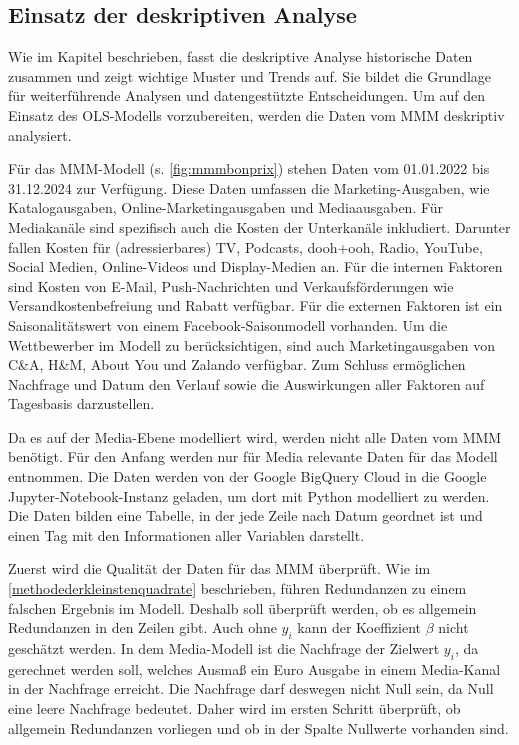 \subsection{Einsatz der deskriptiven Analyse}
\label{EinsatzDerDeskriptivenAnalyse}
Wie im Kapitel  beschrieben, fasst die deskriptive Analyse historische Daten zusammen und zeigt wichtige Muster und Trends auf. Sie bildet die Grundlage für weiterführende Analysen und datengestützte Entscheidungen. Um auf den Einsatz des \ac{OLS}-Modells vorzubereiten, werden die Daten vom \ac{MMM} deskriptiv analysiert. \par
Für das \ac{MMM}-Modell (s. \autoref{fig:mmmbonprix}) stehen Daten vom 01.01.2022 bis 31.12.2024 zur Verfügung. Diese Daten umfassen die Marketing-Ausgaben, wie Katalogausgaben, Online-Marketingausgaben und Mediaausgaben. Für Mediakanäle sind spezifisch auch die Kosten der Unterkanäle inkludiert. Darunter fallen Kosten für (adressierbares) TV, Podcasts, \ac{dooh}+\ac{ooh}, Radio, YouTube, Social Medien, Online-Videos und Display-Medien an. Für die internen Faktoren sind Kosten von E-Mail, Push-Nachrichten und Verkaufsförderungen wie Versandkostenbefreiung und Rabatt verfügbar. Für die externen Faktoren ist ein Saisonalitätswert von einem Facebook-Saisonmodell vorhanden. Um die Wettbewerber im Modell zu berücksichtigen, sind auch Marketingausgaben von C\&A, H\&M, About You und Zalando verfügbar. Zum Schluss ermöglichen Nachfrage und Datum den Verlauf sowie die Auswirkungen aller Faktoren auf Tagesbasis darzustellen. \par
Da es auf der Media-Ebene modelliert wird, werden nicht alle Daten vom \ac{MMM} benötigt. Für den Anfang werden nur für Media relevante Daten für das Modell entnommen. Die Daten werden von der Google BigQuery Cloud in die Google Jupyter-Notebook-Instanz geladen, um dort mit Python modelliert zu werden. Die Daten bilden eine Tabelle, in der jede Zeile nach Datum geordnet ist und einen Tag mit den Informationen aller Variablen darstellt. \par 
Zuerst wird die Qualität der Daten für das \ac{MMM} überprüft. Wie im \autoref{methodederkleinstenquadrate} beschrieben, führen Redundanzen zu einem falschen Ergebnis im Modell. Deshalb soll überprüft werden, ob es allgemein Redundanzen in den Zeilen gibt. Auch ohne \(y_i\) kann der Koeffizient $\beta$ nicht geschätzt werden. In dem Media-Modell ist die Nachfrage der Zielwert \(y_i\), da gerechnet werden soll, welches Ausmaß ein Euro Ausgabe in einem Media-Kanal in der Nachfrage erreicht. Die Nachfrage darf deswegen nicht Null sein, da Null eine leere Nachfrage bedeutet. Daher wird im ersten Schritt überprüft, ob allgemein Redundanzen vorliegen und ob in der Spalte  Nullwerte vorhanden sind.\par
